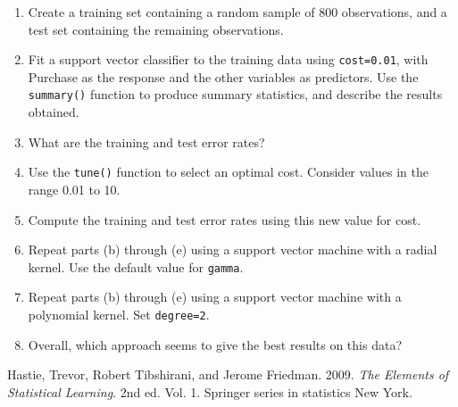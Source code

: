 \documentclass[]{article}
\begin{document}
\begin{enumerate}
\def\labelenumi{(\alph{enumi})}
\item
  Create a training set containing a random sample of 800 observations,
  and a test set containing the remaining observations.
\item
  Fit a support vector classifier to the training data using
  \texttt{cost=0.01}, with Purchase as the response and the other
  variables as predictors. Use the \texttt{summary()} function to
  produce summary statistics, and describe the results obtained.
\item
  What are the training and test error rates?
\item
  Use the \texttt{tune()} function to select an optimal cost. Consider
  values in the range 0.01 to 10.
\item
  Compute the training and test error rates using this new value for
  cost.
\item
  Repeat parts (b) through (e) using a support vector machine with a
  radial kernel. Use the default value for \texttt{gamma}.
\item
  Repeat parts (b) through (e) using a support vector machine with a
  polynomial kernel. Set \texttt{degree=2}.
\item
  Overall, which approach seems to give the best results on this data?
\end{enumerate}

\hypertarget{refs}{}
\leavevmode\hypertarget{ref-ESL}{}%
Hastie, Trevor, Robert Tibshirani, and Jerome Friedman. 2009. \emph{The
Elements of Statistical Learning}. 2nd ed. Vol. 1. Springer series in
statistics New York.
\end{document}

